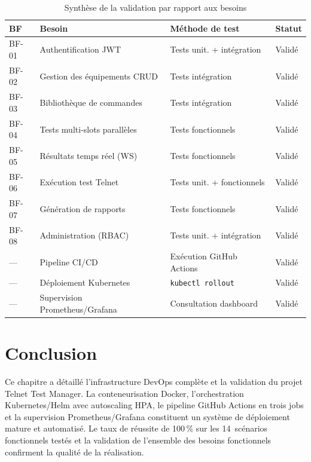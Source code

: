 \begin{table}[H]
  \centering
  \caption{Synthèse de la validation par rapport aux besoins}
  \label{tab:synthese_validation}
  \begin{tabularx}{\textwidth}{|C{1.2cm}|X|L{3.8cm}|L{2.2cm}|}
    \hline
    \textbf{BF} & \textbf{Besoin} & \textbf{Méthode de test} & \textbf{Statut} \\
    \hline
    BF-01 & Authentification JWT           & Tests unit. + intégration  & \textcolor{vertCode}{Validé} \\
    \hline
    BF-02 & Gestion des équipements CRUD   & Tests intégration          & \textcolor{vertCode}{Validé} \\
    \hline
    BF-03 & Bibliothèque de commandes      & Tests intégration          & \textcolor{vertCode}{Validé} \\
    \hline
    BF-04 & Tests multi-slots parallèles   & Tests fonctionnels         & \textcolor{vertCode}{Validé} \\
    \hline
    BF-05 & Résultats temps réel (WS)      & Tests fonctionnels         & \textcolor{vertCode}{Validé} \\
    \hline
    BF-06 & Exécution test Telnet          & Tests unit. + fonctionnels & \textcolor{vertCode}{Validé} \\
    \hline
    BF-07 & Génération de rapports         & Tests fonctionnels         & \textcolor{vertCode}{Validé} \\
    \hline
    BF-08 & Administration (RBAC)          & Tests unit. + intégration  & \textcolor{vertCode}{Validé} \\
    \hline
    ---   & Pipeline CI/CD                 & Exécution GitHub Actions   & \textcolor{vertCode}{Validé} \\
    \hline
    ---   & Déploiement Kubernetes         & \texttt{kubectl rollout}   & \textcolor{vertCode}{Validé} \\
    \hline
    ---   & Supervision Prometheus/Grafana & Consultation dashboard     & \textcolor{vertCode}{Validé} \\
    \hline
  \end{tabularx}
\end{table}

\section*{Conclusion}

Ce chapitre a détaillé l'infrastructure DevOps complète et la validation
du projet Telnet Test Manager. La conteneurisation Docker, l'orchestration
Kubernetes/Helm avec autoscaling HPA, le pipeline GitHub Actions en trois
jobs et la supervision Prometheus/Grafana constituent un système de
déploiement mature et automatisé. Le taux de réussite de 100\,\% sur les
14~scénarios fonctionnels testés et la validation de l'ensemble des
besoins fonctionnels confirment la qualité de la réalisation.
